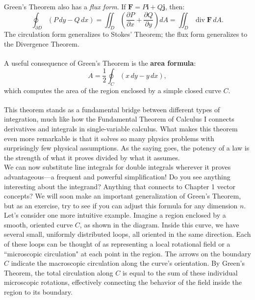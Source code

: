 \noindent Green's Theorem also has a \textit{flux form}. If \( \mathbf{F} = P\mathbf{i} + Q\mathbf{j} \), then:
\[
\oint_{\partial D} (P \, dy - Q \, dx) = \iint_D \left(\frac{\partial P}{\partial x} + \frac{\partial Q}{\partial y}\right) dA = \iint_D \operatorname{div} \mathbf{F} \, dA.
\]
The circulation form generalizes to Stokes' Theorem; the flux form generalizes to the Divergence Theorem.\\ \\
\noindent A useful consequence of Green's Theorem is the \textbf{area formula}:
\[
A = \frac{1}{2}\oint_C (x \, dy - y \, dx),
\]
which computes the area of the region enclosed by a simple closed curve \( C \).\\ \\
\noindent This theorem stands as a fundamental bridge between different types of integration, much like how the Fundamental Theorem of Calculus I connects derivatives and integrals in single-variable calculus. What makes this theorem even more remarkable is that it solves so many physics problems with surprisingly few physical assumptions. As the saying goes, the potency of a law is the strength of what it proves divided by what it assumes. \\

\noindent We can now substitute line integrals for double integrals wherever it proves advantageous—a frequent and powerful simplification! Do you see anything interesting about the integrand? Anything that connects to Chapter 1 vector concepts? We will soon make an important generalization of Green's Theorem, but as an exercise, try to see if you can adjust this formula for any dimension $n$. \\

\noindent Let's consider one more intuitive example. Imagine a region enclosed by a smooth, oriented curve $C$, as shown in the diagram. Inside this curve, we have several small, uniformly distributed loops, all oriented in the same direction. Each of these loops can be thought of as representing a local rotational field or a ``microscopic circulation" at each point in the region. The arrows on the boundary $C$ indicate the macroscopic circulation along the curve's orientation. By Green's Theorem, the total circulation along $C$ is equal to the sum of these individual microscopic rotations, effectively connecting the behavior of the field inside the region to its boundary.



